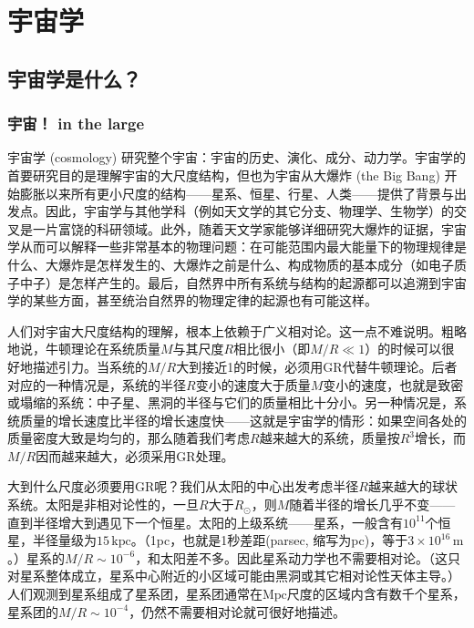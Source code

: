 \chapter{宇宙学}
\label{chap12}

\section{宇宙学是什么？}
\label{sec12.1}
\subsection*{宇宙！ in  the  large  }
宇宙学 (cosmology) 研究整个宇宙：宇宙的历史、演化、成分、动力学。宇宙学的首要研究目的是理解宇宙的大尺度结构，但也为宇宙从大爆炸 (the Big Bang) 开始膨胀以来所有更小尺度的结构——星系、恒星、行星、人类——提供了背景与出发点。因此，宇宙学与其他学科（例如天文学的其它分支、物理学、生物学）的交叉是一片富饶的科研领域。此外，随着天文学家能够详细研究大爆炸的证据，宇宙学从而可以解释一些非常基本的物理问题：在可能范围内最大能量下的物理规律是什么、大爆炸是怎样发生的、大爆炸之前是什么、构成物质的基本成分（如电子质子中子）是怎样产生的。最后，自然界中所有系统与结构的起源都可以追溯到宇宙学的某些方面，甚至统治自然界的物理定律的起源也有可能这样。

人们对宇宙大尺度结构的理解，根本上依赖于广义相对论。这一点不难说明。粗略地说，牛顿理论在系统质量$M$与其尺度$R$相比很小（即$M/R \ll 1$）的时候可以很好地描述引力。当系统的$M/R$大到接近1的时候，必须用GR代替牛顿理论。后者对应的一种情况是，系统的半径$R$变小的速度大于质量$M$变小的速度，也就是致密或塌缩的系统：中子星、黑洞的半径与它们的质量相比十分小。另一种情况是，系统质量的增长速度比半径的增长速度快——这就是宇宙学的情形：如果空间各处的质量密度大致是均匀的，那么随着我们考虑$R$越来越大的系统，质量按$R^3$增长，而$M/R$因而越来越大，必须采用GR处理。

大到什么尺度必须要用GR呢？我们从太阳的中心出发考虑半径$R$越来越大的球状系统。太阳是非相对论性的，一旦$R$大于$R_\odot$，则$M$随着半径的增长几乎不变——直到半径增大到遇见下一个恒星。太阳的上级系统——星系，一般含有$10^{11}$个恒星，半径量级为$15\,\text{kpc}$。（1pc，也就是1秒差距(parsec, 缩写为pc)，等于$3 \times 10^{16}\,\text{m}$。）星系的$M/R \sim 10^{-6}$，和太阳差不多。因此星系动力学也不需要相对论。（这只对星系整体成立，星系中心附近的小区域可能由黑洞或其它相对论性天体主导。） 人们观测到星系组成了星系团，星系团通常在$\text{Mpc}$尺度的区域内含有数千个星系，星系团的$M/R \sim 10^{-4}$，仍然不需要相对论就可很好地描述。

